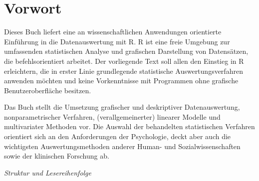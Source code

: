 \chapter*{Vorwort}

Dieses Buch liefert eine an wissenschaftlichen Anwendungen orientierte Einführung in die Datenauswertung mit R. R ist eine freie Umgebung zur umfassenden statistischen Analyse und grafischen Darstellung von Datensätzen, die befehlsorientiert arbeitet. Der vorliegende Text soll allen den Einstieg in R erleichtern, die in erster Linie grundlegende statistische Auswertungsverfahren anwenden möchten und keine Vorkenntnisse mit Programmen ohne grafische Benutzeroberfläche besitzen.

Das Buch stellt die Umsetzung grafischer und deskriptiver Datenauswertung, nonparametrischer Verfahren, (verallgemeinerter) linearer Modelle und multivariater Methoden vor. Die Auswahl der behandelten statistischen Verfahren orientiert sich an den Anforderungen der Psychologie, deckt aber auch die wichtigsten Auswertungsmethoden anderer Human- und Sozialwissenschaften sowie der klinischen Forschung ab.

\textit{Struktur und Lesereihenfolge}

